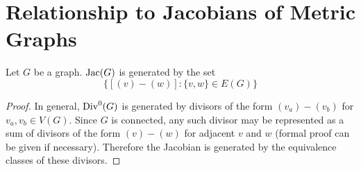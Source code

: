 \documentclass{amsart}
\begin{document}
\section{Relationship to Jacobians of Metric Graphs}
\begin{lem}
  \label{lem:jac_generators}
  Let $G$ be a graph. $\operatorname{Jac}(G)$ is generated by the set \[\{[(v) -
  (w)]: \{v, w\} \in E(G)\}\]
\end{lem}

\begin{proof}
  In general, $\operatorname{Div}^0(G)$ is generated by divisors of the form $(v_a)
  - (v_b)$ for $v_a, v_b \in V(G)$. Since $G$ is connected, any such
  divisor may be represented as a sum of divisors of the form $(v) -
  (w)$ for adjacent $v$ and $w$ (formal proof can be given if
  necessary). Therefore the Jacobian is generated by the equivalence
  classes of these divisors.  
\end{proof}
\end{document}
